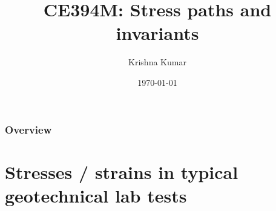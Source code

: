 \documentclass[notes]{beamer}
\title[CE394M: Stresses - paths \& invariants]{CE394M: Stress paths and invariants}
\author{Krishna Kumar} %
\institute[UT Austin] %
{
University of Texas at Austin \\
\medskip
\textit{
  \url{krishnak@utexas.edu}} %
}
\date{\today} %
\begin{document}
\begin{frame}
\titlepage %
\end{frame}

\begin{frame}
 \frametitle{Overview}
 \tableofcontents
\end{frame}

\section{Stresses / strains in typical geotechnical lab tests}
\end{document}
